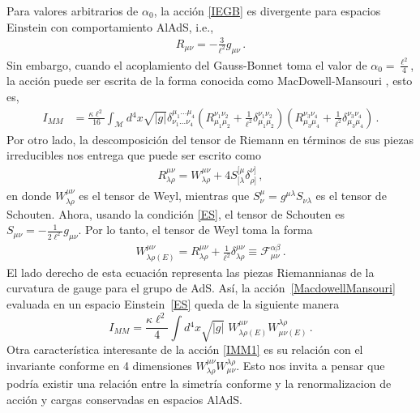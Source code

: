 \documentclass[../Main.tex]{subfiles}
\begin{document}
Para valores arbitrarios de $\alpha_{0}$, la acción \eqref{IEGB} es divergente para espacios Einstein con comportamiento AlAdS, i.e.,
\begin{align}
    R_{\mu\nu}=-\frac{3}{\ell^2} g_{\mu\nu} \, . \label{ES}
\end{align}
Sin embargo, cuando el acoplamiento del Gauss-Bonnet toma el valor de $\alpha_{0}=\tfrac{\ell^2}{4}$, la acción puede ser escrita de la forma conocida como MacDowell-Mansouri \cite{MacDowell:1977jt}, esto es,
\begin{align}
    \label{MacdowellMansouri}
    I_{MM} &= \frac{\kappa \ell^2}{16}\int_{\mathcal{M}} d{^4x}\sqrt{\lvert g\rvert}\delta^{\mu_1\ldots\mu_4}_{\nu_1\ldots\nu_4}\left(R^{\nu_1\nu_2}_{\mu_1\mu_2} + \frac{1}{\ell^2}\delta^{\nu_1\nu_2}_{\mu_1\mu_2} \right)\left(R^{\nu_3\nu_4}_{\mu_3\mu_4} + \frac{1}{\ell^2}\delta^{\nu_3\nu_4}_{\mu_3\mu_4} \right) \, .
\end{align}
Por otro lado, la descomposición del tensor de Riemann en términos de sus piezas irreducibles nos entrega que puede ser escrito como
\begin{align}
    R^{\mu\nu}_{\lambda\rho}=W^{\mu\nu}_{\lambda\rho}+4S^{[\mu}_{[\lambda}\delta^{\nu]}_{\rho]}\, , \label{desc}
\end{align}
en donde $W^{\mu\nu}_{\lambda\rho}$ es el tensor de Weyl, mientras que  $S^{\mu}_{\nu}=g^{\mu\lambda}S_{\nu\lambda}$ es el tensor de Schouten.
Ahora, usando la condición \eqref{ES}, el tensor de Schouten es $S_{\mu\nu}=-\tfrac{1}{2\ell^2}g_{\mu\nu}$. Por lo tanto, el tensor de Weyl toma la forma 
\begin{align}
    W^{\mu\nu}_{\lambda\rho(E)} = R^{\mu\nu}_{\lambda\rho} + \frac{1}{\ell^2}\delta^{\mu\nu}_{\lambda\rho} \equiv \mathcal{F}^{\alpha \beta}_{\mu \nu}  \, .
\end{align}
El lado derecho de esta ecuación representa las piezas Riemannianas de la curvatura de gauge para el grupo de AdS. Así, la acción~\eqref{MacdowellMansouri} evaluada en un espacio Einstein~\eqref{ES} queda de la siguiente manera
\begin{equation}
    I_{MM} = \frac{\kappa\ell^2}{4}\int d{^4x}\sqrt{\lvert g\rvert}\;W^{\mu\nu}_{\lambda\rho(E)}W^{\lambda\rho}_{\mu\nu(E)} \,. \label{IMM1}
\end{equation}
 Otra característica interesante de la acción \eqref{IMM1}  es  su relación con el invariante conforme en 4 dimensiones $W^{\mu\nu}_{\lambda\rho}W^{\lambda\rho}_{\mu\nu}$.
 Esto nos invita a pensar que podría existir una relación entre la simetría conforme y la renormalizacion de acción y cargas conservadas en espacios AlAdS. 




\biblio %
\end{document}
